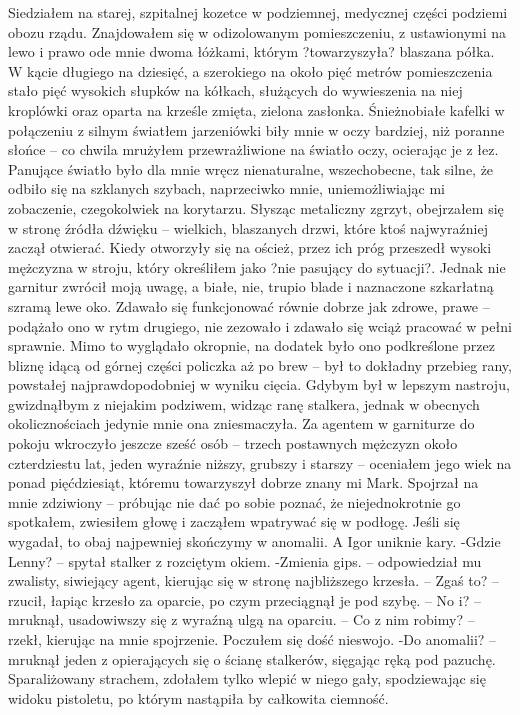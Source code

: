 \documentclass[../MAIN.tex]{subfiles}
\begin{document}
Siedziałem na starej, szpitalnej kozetce w podziemnej, medycznej części podziemi obozu rządu. Znajdowałem się w odizolowanym pomieszczeniu, z ustawionymi na lewo i prawo ode mnie dwoma łóżkami, którym ?towarzyszyła? blaszana półka. W kącie długiego na dziesięć, a szerokiego na około pięć metrów pomieszczenia stało pięć wysokich słupków na kółkach, służących do wywieszenia na niej kroplówki oraz oparta na krześle zmięta, zielona zasłonka.
Śnieżnobiałe kafelki w połączeniu z silnym światłem jarzeniówki biły mnie w oczy bardziej, niż poranne słońce -- co chwila mrużyłem przewrażliwione na światło oczy, ocierając je z łez. Panujące światło było dla mnie wręcz nienaturalne, wszechobecne, tak silne, że odbiło się na szklanych szybach, naprzeciwko mnie, uniemożliwiając mi zobaczenie, czegokolwiek na korytarzu.
Słysząc metaliczny zgrzyt, obejrzałem się w stronę źródła dźwięku -- wielkich, blaszanych drzwi, które ktoś najwyraźniej zaczął otwierać.
Kiedy otworzyły się na oścież, przez ich próg przeszedł wysoki mężczyzna w stroju, który określiłem jako ?nie pasujący do sytuacji?. Jednak nie garnitur zwrócił moją uwagę, a białe, nie, trupio blade i naznaczone szkarłatną szramą lewe oko. Zdawało się funkcjonować równie dobrze jak zdrowe, prawe -- podążało ono w rytm drugiego, nie zezowało i zdawało się wciąż pracować w pełni sprawnie. Mimo to wyglądało okropnie, na dodatek było ono podkreślone przez bliznę idącą od górnej części policzka aż po brew -- był to dokładny przebieg rany, powstałej najprawdopodobniej w wyniku cięcia.
Gdybym był w lepszym nastroju, gwizdnąłbym z niejakim podziwem, widząc ranę stalkera, jednak w obecnych okolicznościach jedynie mnie ona zniesmaczyła.
Za agentem w garniturze do pokoju wkroczyło jeszcze sześć osób -- trzech postawnych mężczyzn około czterdziestu lat, jeden wyraźnie niższy, grubszy i starszy -- oceniałem jego wiek na ponad pięćdziesiąt, któremu towarzyszył dobrze znany mi Mark.
Spojrzał na mnie zdziwiony -- próbując nie dać po sobie poznać, że niejednokrotnie go spotkałem, zwiesiłem głowę i zacząłem wpatrywać się w podłogę.
Jeśli się wygadał, to obaj najpewniej skończymy w anomalii.
A Igor uniknie kary.
-Gdzie Lenny? -- spytał stalker z rozciętym okiem.
-Zmienia gips. -- odpowiedział mu zwalisty, siwiejący agent, kierując się w stronę najbliższego krzesła. -- Zgaś to? -- rzucił, łapiąc krzesło za oparcie, po czym przeciągnął je pod szybę. -- No i? -- mruknął, usadowiwszy się z wyraźną ulgą na oparciu. -- Co z nim robimy? -- rzekł, kierując na mnie spojrzenie.
Poczułem się dość nieswojo.
-Do anomalii? -- mruknął jeden z opierających się o ścianę stalkerów, sięgając ręką pod pazuchę. Sparaliżowany strachem, zdołałem tylko wlepić w niego gały, spodziewając się widoku pistoletu, po którym nastąpiła by całkowita ciemność.
\end{document}
